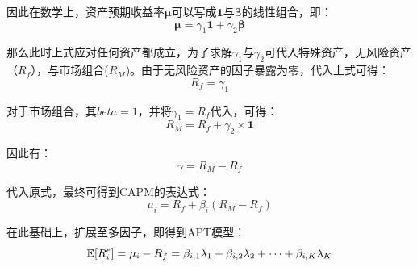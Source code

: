 \documentclass[11pt]{article}
\begin{document}
\begin{appendices}
因此在数学上，资产预期收益率$\bm{\mu}$可以写成$\bm{1}$与$\bm{\beta}$的线性组合，即：
\begin{equation*}
    \bm{\mu} = \gamma_1 \bm{1} + \gamma_2 \bm{\beta}
\end{equation*}

那么此时上式应对任何资产都成立，为了求解$\gamma_1$与$\gamma_2$可代入特殊资产，无风险资产（$R_f$），与市场组合($R_M$)。由于无风险资产的因子暴露为零，代入上式可得：
\begin{equation*}
    R_f = \gamma_1
\end{equation*}

对于市场组合，其$beta=1$，并将$\gamma_1 = R_f$代入，可得：
\begin{equation*}
    R_M = R_f + \gamma_2 \times \bm{1}
\end{equation*}

因此有：
\begin{equation*}
    \gamma = R_M - R_f
\end{equation*}

代入原式，最终可得到CAPM的表达式：
\begin{equation*}
    \mu_i = R_f + \beta_i(R_M - R_f)
\end{equation*}

在此基础上，扩展至多因子，即得到APT模型：
\begin{equation*}
    \mathbb{E}[R_{i}^{e}] = \mu_i - R_f = \beta_{i,1} \lambda_1 + \beta_{i,2} \lambda_2 + \dots + \beta_{i,K} \lambda_K
\end{equation*}

\end{appendices}
\end{document}
